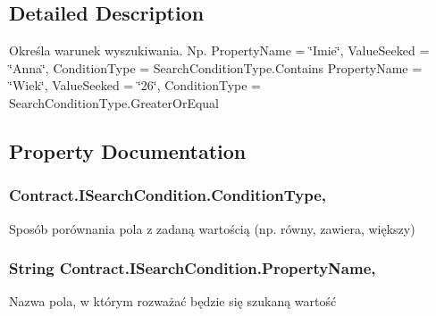 \subsection{Detailed Description}
Określa warunek wyszukiwania. Np. Property\+Name = \char`\"{}\+Imie\char`\"{}, Value\+Seeked = \char`\"{}\+Anna\char`\"{}, Condition\+Type = Search\+Condition\+Type.\+Contains Property\+Name = \char`\"{}\+Wiek\char`\"{}, Value\+Seeked = \char`\"{}26\char`\"{}, Condition\+Type = Search\+Condition\+Type.\+Greater\+Or\+Equal 



\subsection{Property Documentation}
\hypertarget{interface_contract_1_1_i_search_condition_a48da2c8880a2efa80cb2f74d3511da56}{}
\subsubsection[{Condition\+Type}]{ Contract.\+I\+Search\+Condition.\+Condition\+Type\hspace{0.3cm}{\ttfamily [get]}, {\ttfamily [set]}}\label{interface_contract_1_1_i_search_condition_a48da2c8880a2efa80cb2f74d3511da56}


Sposób porównania pola z zadaną wartością (np. równy, zawiera, większy) 

\hypertarget{interface_contract_1_1_i_search_condition_a8f7b70f08060863e7c9e7b1055d8561c}{}
\subsubsection[{Property\+Name}]{\setlength{\rightskip}{0pt plus 5cm}String Contract.\+I\+Search\+Condition.\+Property\+Name\hspace{0.3cm}{\ttfamily [get]}, {\ttfamily [set]}}\label{interface_contract_1_1_i_search_condition_a8f7b70f08060863e7c9e7b1055d8561c}


Nazwa pola, w którym rozważać będzie się szukaną wartość 

